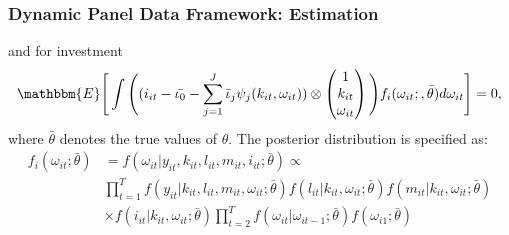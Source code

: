 \documentclass{beamer}
\begin{document}

\begin{frame}
\frametitle{Dynamic Panel Data Framework: Estimation}
and for investment
\begin{equation}\label{iimc}
\begin{split}
\mathbbm{E}\Bigg[\int\Bigg((i_{it}-\bar{\iota_{0}}-\sum_{j=1}^{J}\bar{\iota}_{j}\psi_{j}(k_{it}, \omega_{it}))\otimes
\begin{pmatrix}
1 \\
k_{it} \\
\omega_{it}
\end{pmatrix}
\Bigg)f_{i}(\omega_{it};,\bar{\theta})d\omega_{it}\Bigg]=0,
\end{split}
\end{equation}
where $\bar{\theta}$ denotes the true values of $\theta$. The posterior distribution is specified as:
\begin{equation}\label{posterior}
\begin{split}
f_{i}(\omega_{it};\bar{\theta})&=f(\omega_{it}|y_{it}, k_{it}, l_{it}, m_{it}, i_{it}; \bar{\theta}) \propto\\
&\prod_{t=1}^{T}f(y_{it}|k_{it}, l_{it}, m_{it}, \omega_{it};\bar{\theta})f(l_{it}|k_{it}, \omega_{it};\bar{\theta})f(m_{it}|k_{it}, \omega_{it};\bar{\theta}) \\
&\times f(i_{it}|k_{it}, \omega_{it};\bar{\theta})\prod_{t=2}^{T}f(\omega_{it}|\omega_{it-1};\bar{\theta})f(\omega_{i1};\bar{\theta})
\end{split}
\end{equation}
\end{frame}

\end{document}
